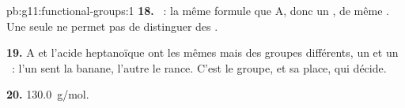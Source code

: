 \begin{solution}{pb:g11:functional-groups:1}
\textbf{18.} ~: la même formule que A, donc un , de
même . Une  seule ne permet pas de distinguer
des .

\textbf{19.} A et l'acide heptanoïque ont les mêmes  mais des
groupes différents, un  et un ~: l'un sent la
banane, l'autre le rance. C'est le groupe, et sa place, qui décide.

\textbf{20.} \qty{130.0}{g/mol}.
\end{solution}
